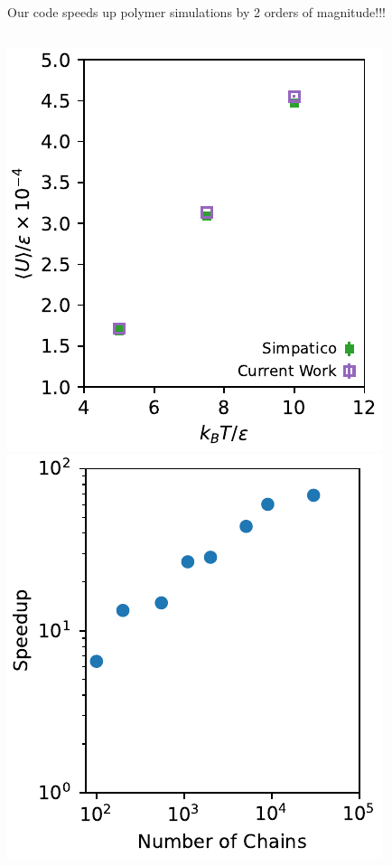 \documentclass[aspectratio=169]{beamer}
\begin{document}
\begin{frame}[c]{Our code speeds up polymer simulations by 2 orders of magnitude!!!}

  \begin{columns}[T]
    \centering
    \includegraphics[]{figs/fig-accuracy.pdf}
    \centering
    \includegraphics[]{figs/fig-speedup.pdf}
  \end{columns}

\end{frame}
\end{document}
